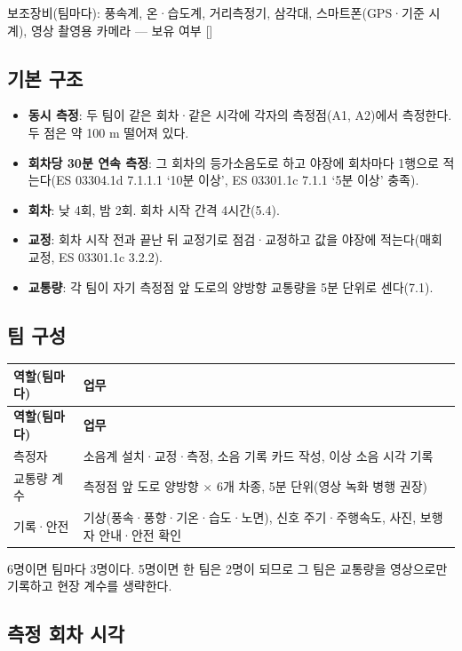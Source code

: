 \documentclass[10.5pt,a4paper]{article}
\newcommand{\IN}{[\quad]}
\newcommand{\hd}[1]{\cellcolor{headfill}\textbf{\sffamily #1}}
\begin{document}
\addtocounter{table}{-1}
\normalsize
보조장비(팀마다): 풍속계, 온·습도계, 거리측정기, 삼각대, 스마트폰(GPS·기준 시계), 영상 촬영용 카메라 --- 보유 여부 \IN
{}\subsection{기본 구조}
\begin{itemize}
\item \textbf{동시 측정}: 두 팀이 같은 회차·같은 시각에 각자의 측정점(A1, A2)에서 측정한다. 두 점은 약 100 m 떨어져 있다.
\item \textbf{회차당 30분 연속 측정}: 그 회차의 등가소음도로 하고 야장에 회차마다 1행으로 적는다(ES 03304.1d 7.1.1.1 `10분 이상', ES 03301.1c 7.1.1 `5분 이상' 충족).
\item \textbf{회차}: 낮 4회, 밤 2회. 회차 시작 간격 4시간(5.4).
\item \textbf{교정}: 회차 시작 전과 끝난 뒤 교정기로 점검·교정하고 값을 야장에 적는다(매회 교정, ES 03301.1c 3.2.2).
\item \textbf{교통량}: 각 팀이 자기 측정점 앞 도로의 양방향 교통량을 5분 단위로 센다(7.1).
\end{itemize}
\subsection{팀 구성}
\small
\begin{longtable}{>{\raggedright\arraybackslash}p{}>{\raggedright\arraybackslash}p{}}
\toprule
\hd{역할(팀마다)} & \hd{업무} \\ \midrule
\endfirsthead
\toprule
\hd{역할(팀마다)} & \hd{업무} \\ \midrule
\endhead
\bottomrule
\endlastfoot
측정자 & 소음계 설치·교정·측정, 소음 기록 카드 작성, 이상 소음 시각 기록 \\ \midrule
교통량 계수 & 측정점 앞 도로 양방향 $\times$ 6개 차종, 5분 단위(영상 녹화 병행 권장) \\ \midrule
기록·안전 & 기상(풍속·풍향·기온·습도·노면), 신호 주기·주행속도, 사진, 보행자 안내·안전 확인 \\
\end{longtable}
\addtocounter{table}{-1}
\normalsize
{\small 6명이면 팀마다 3명이다. 5명이면 한 팀은 2명이 되므로 그 팀은 교통량을 영상으로만 기록하고 현장 계수를 생략한다.\par}
\subsection{측정 회차 시각}
\end{document}
